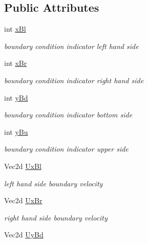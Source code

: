 \subsection*{Public Attributes}
\begin{CompactItemize}
\item 
int \hyperlink{classBoundary_10dd58ba0715412968c4902fe80b1318}{xBl}
\begin{CompactList}\small\item\em boundary condition indicator left hand side \item\end{CompactList}\item 
int \hyperlink{classBoundary_4a582b489cb580b8a6f3a7123f411a53}{xBr}
\begin{CompactList}\small\item\em boundary condition indicator right hand side \item\end{CompactList}\item 
int \hyperlink{classBoundary_0329bf6b954b3001418391cc16a9194e}{yBd}
\begin{CompactList}\small\item\em boundary condition indicator bottom side \item\end{CompactList}\item 
int \hyperlink{classBoundary_6ccff2a8c5a10104d202504034af9e84}{yBu}
\begin{CompactList}\small\item\em boundary condition indicator upper side \item\end{CompactList}\item 
\hypertarget{classBoundary_238a4e6e7358e1f9a2375d8df08a5c7a}{
Vec2d \hyperlink{classBoundary_238a4e6e7358e1f9a2375d8df08a5c7a}{UxBl}}
\label{classBoundary_238a4e6e7358e1f9a2375d8df08a5c7a}

\begin{CompactList}\small\item\em left hand side boundary velocity \item\end{CompactList}\item 
\hypertarget{classBoundary_375a949ddac9f633af007daa7d323099}{
Vec2d \hyperlink{classBoundary_375a949ddac9f633af007daa7d323099}{UxBr}}
\label{classBoundary_375a949ddac9f633af007daa7d323099}

\begin{CompactList}\small\item\em right hand side boundary velocity \item\end{CompactList}\item 
\hypertarget{classBoundary_cf4a2665428f1516626bf683d1eeb4ba}{
Vec2d \hyperlink{classBoundary_cf4a2665428f1516626bf683d1eeb4ba}{UyBd}}
\label{classBoundary_cf4a2665428f1516626bf683d1eeb4ba}


\end{CompactItemize}
